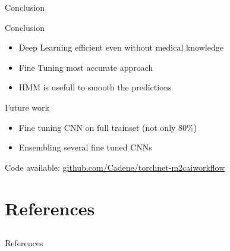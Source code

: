 \begin{frame}{Conclusion}

	\begin{block}{Conclusion}
		\begin{itemize}
			\item Deep Learning efficient even without medical knowledge%
			\item Fine Tuning most accurate approach %
			\item HMM is usefull to smooth the predictions %
		\end{itemize}
	\end{block}
	
	\begin{block}{Future work}
		\begin{itemize}
			\item Fine tuning CNN on full trainset (not only 80\%)
			\item Ensembling several fine tuned CNNs
		\end{itemize}
	\end{block}
	
	Code available: \url{github.com/Cadene/torchnet-m2caiworkflow}
	
\end{frame}

\section{References} \subsection{}\label{references}

\begin{frame}[allowframebreaks]{References}
	\nocite{*}
	\printbibliography[heading=none]
	
\end{frame}

